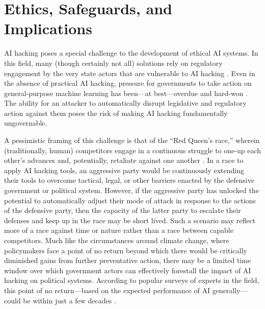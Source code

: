 \documentclass[nonacm,12pt]{acmart}
\begin{document}
\section{Ethics, Safeguards, and Implications}

AI hacking poses a special challenge to the development of ethical AI systems. In this field, many (though certainly not all) solutions rely on regulatory engagement by the very state actors that are vulnerable to AI hacking \cite[for recent reviews, see][]{cath_governing_2018, jobin_global_2019}. 
Even in the absence of practical AI hacking, pressure for governments to take action on general-purpose machine learning has been---at best---overdue and hard-won \citep{resseguier_ai_2020}. 
The ability for an attacker to automatically disrupt legislative and regulatory action against them poses the risk of making AI hacking fundamentally ungovernable. 

A pessimistic framing of this challenge is that of the ``Red Queen's race,'' wherein (traditionally, human) competitors engage in a continuous struggle to one-up each other's advances and, potentially, retaliate against one another \cite{taddeo_regulate_2018, asaro_what_2019, smuha_race_2021}. 
In a race to apply AI hacking tools, an aggressive party would be continuously extending their tools to overcome tactical, legal, or other barriers enacted by the defensive government or political system.  
However, if the aggressive party has unlocked the potential to automatically adjust their mode of attack in response to the actions of the defensive party, then the capacity of the latter party to escalate their defenses and keep up in the race may be short lived.  Such a scenario may reflect more of a race against time or nature rather than a race between capable competitors.  
Much like the circumstances around climate change, where policymakers face a point of no return beyond which there would be critically diminished gains from further preventative action, there may be a limited time window over which government actors can effectively forestall the impact of AI hacking on political systems.  
According to popular surveys of experts in the field, this point of no return---based on the expected performance of AI generally---could be within just a few decades \cite[e.g.][]{gruetzemacher_forecasting_2019}.
\end{document}
